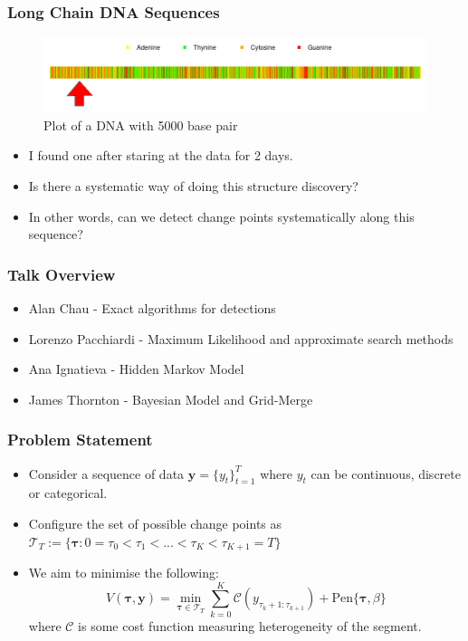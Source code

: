 \documentclass{beamer}
\begin{document}
\begin{frame}
\frametitle{Long Chain DNA Sequences}
    \begin{figure}[h]
        \centering
        \includegraphics[scale=0.4]{5000_DNA_with_arrow.png}
        \caption{Plot of a DNA with 5000 base pair}
        \label{fig:my_label}
    \end{figure}
\begin{itemize}
    \item I found one after staring at the data for 2 days.
    \pause
    \item Is there a systematic way of doing this structure discovery?
    \pause
    \item In other words, can we detect change points systematically along this sequence?
\end{itemize}

\end{frame}


\begin{frame}
\frametitle{Talk Overview}
\begin{itemize}
\item Alan Chau - Exact algorithms for detections
\item Lorenzo Pacchiardi - Maximum Likelihood and approximate search methods
\item Ana Ignatieva - Hidden Markov Model
\item James Thornton - Bayesian Model and Grid-Merge
\end{itemize}
\end{frame}


\begin{frame}
\frametitle{Problem Statement}
\begin{itemize}
    \item Consider a sequence of data $\mathbf{y} = \{y_t\}_{t=1}^T$ where $y_t$ can be continuous, discrete or categorical. 
    \item Configure the set of possible change points as  $\mathcal{T}_{T} := \{\bm{\tau}: 0 = \tau_0 < \tau_1 < ... <\tau_K < \tau_{K+1} = T\}$
    \item We aim to minimise the following:
\begin{equation}
    V(\bm{\tau}, \mathbf{y}) = \min_{\bm{\tau} \in \mathcal{T}_{T}} \sum_{k = 0}^K \mathcal{C}(y_{\tau_k+1:\tau_{k+1}}) + \text{Pen}\{\bm{\tau}, \beta\}
\end{equation}
where $\mathcal{C}$ is some cost function measuring heterogeneity of the segment.
\end{itemize}
\end{frame}
\end{document}
